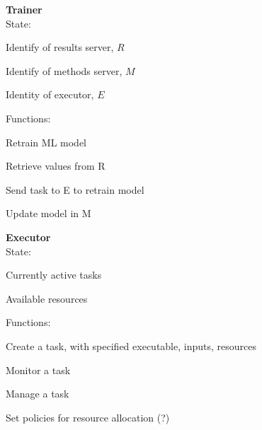 \documentclass[10pt]{article}
\begin{document}
\noindent
\textbf{Trainer}\\
State:
\begin{compactitem}
\item
Identify of results server, $R$
\item
Identify of methods server, $M$
\item
Identity of executor, $E$
\end{compactitem}
Functions:
\begin{compactitem}
\item
Retrain ML model
\item
Retrieve values from R
\item
Send task to E to retrain model 
\item
Update model in M
\end{compactitem}


\vspace{3ex}

\noindent
\textbf{Executor}\\
State:
\begin{compactitem}
\item
Currently active tasks
\item
Available resources
\end{compactitem}
Functions:
\begin{compactitem}
\item
Create a task, with specified executable, inputs, resources
\item
Monitor a task
\item
Manage a task
\item
Set policies for resource allocation (?)
\end{compactitem}
\end{document}
